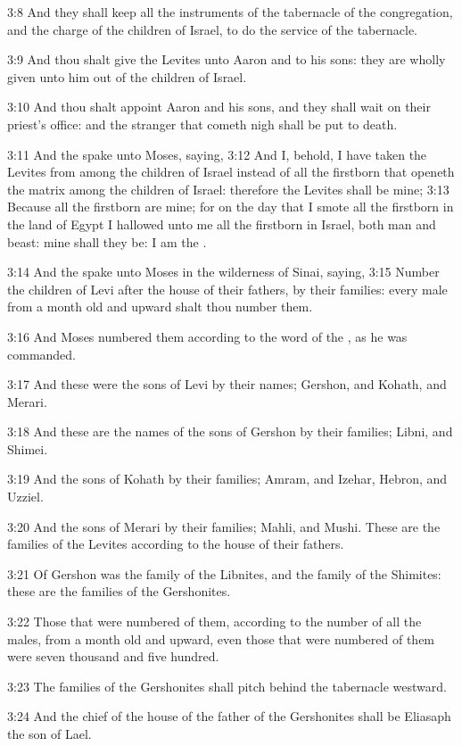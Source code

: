 3:8 And they shall keep all the instruments of the tabernacle of the
congregation, and the charge of the children of Israel, to do the
service of the tabernacle.

3:9 And thou shalt give the Levites unto Aaron and to his sons: they
are wholly given unto him out of the children of Israel.

3:10 And thou shalt appoint Aaron and his sons, and they shall wait on
their priest's office: and the stranger that cometh nigh shall be put
to death.

3:11 And the \LORD spake unto Moses, saying, 3:12 And I, behold, I have
taken the Levites from among the children of Israel instead of all the
firstborn that openeth the matrix among the children of Israel:
therefore the Levites shall be mine; 3:13 Because all the firstborn
are mine; for on the day that I smote all the firstborn in the land of
Egypt I hallowed unto me all the firstborn in Israel, both man and
beast: mine shall they be: I am the \LORD.

3:14 And the \LORD spake unto Moses in the wilderness of Sinai, saying,
3:15 Number the children of Levi after the house of their fathers, by
their families: every male from a month old and upward shalt thou
number them.

3:16 And Moses numbered them according to the word of the \LORD, as he
was commanded.

3:17 And these were the sons of Levi by their names; Gershon, and
Kohath, and Merari.

3:18 And these are the names of the sons of Gershon by their families;
Libni, and Shimei.

3:19 And the sons of Kohath by their families; Amram, and Izehar,
Hebron, and Uzziel.

3:20 And the sons of Merari by their families; Mahli, and Mushi. These
are the families of the Levites according to the house of their
fathers.

3:21 Of Gershon was the family of the Libnites, and the family of the
Shimites: these are the families of the Gershonites.

3:22 Those that were numbered of them, according to the number of all
the males, from a month old and upward, even those that were numbered
of them were seven thousand and five hundred.

3:23 The families of the Gershonites shall pitch behind the tabernacle
westward.

3:24 And the chief of the house of the father of the Gershonites shall
be Eliasaph the son of Lael.


